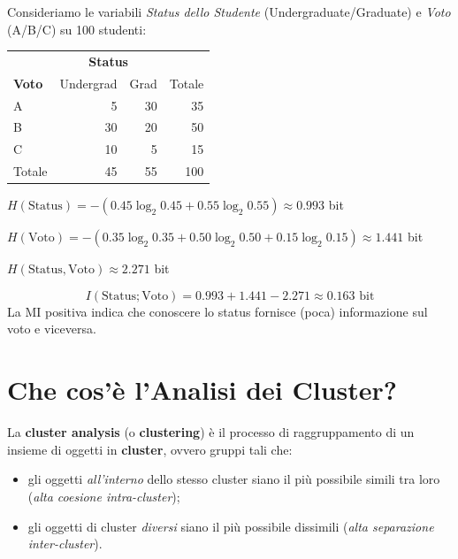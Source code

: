 \begin{example}
Consideriamo le variabili \textit{Status dello Studente} (Undergraduate/Graduate) e \textit{Voto} (A/B/C) su 100 studenti:

\begin{center}
\small
\begin{tabularx}{0.85\linewidth}{l r r r}
\toprule
& \multicolumn{2}{c}{\textbf{Status}} & \\
\textbf{Voto} & Undergrad & Grad & Totale \\
\midrule
A & 5 & 30 & 35 \\
B & 30 & 20 & 50 \\
C & 10 & 5  & 15 \\
\midrule
Totale & 45 & 55 & 100 \\
\bottomrule
\end{tabularx}
\end{center}

$H(\text{Status}) = -(0.45\log_2 0.45 + 0.55\log_2 0.55) \approx 0.993$ bit

$H(\text{Voto}) = -(0.35\log_2 0.35 + 0.50\log_2 0.50 + 0.15\log_2 0.15) \approx 1.441$ bit

$H(\text{Status}, \text{Voto}) \approx 2.271$ bit

\[
  I(\text{Status}; \text{Voto}) = 0.993 + 1.441 - 2.271 \approx \mathbf{0.163} \text{ bit}
\]
La MI positiva indica che conoscere lo status fornisce (poca) informazione sul voto e viceversa.
\end{example}


\section{Che cos'è l'Analisi dei Cluster?}
\label{sec:cluster-analysis}

\begin{definition}
La \textbf{cluster analysis} (o \textbf{clustering}) è il processo di raggruppamento di un insieme di oggetti in \textbf{cluster}, ovvero gruppi tali che:
\begin{itemize}
  \item gli oggetti \textit{all'interno} dello stesso cluster siano il più possibile simili tra loro (\textit{alta coesione intra-cluster});
  \item gli oggetti di cluster \textit{diversi} siano il più possibile dissimili (\textit{alta separazione inter-cluster}).
\end{itemize}
\end{definition}

